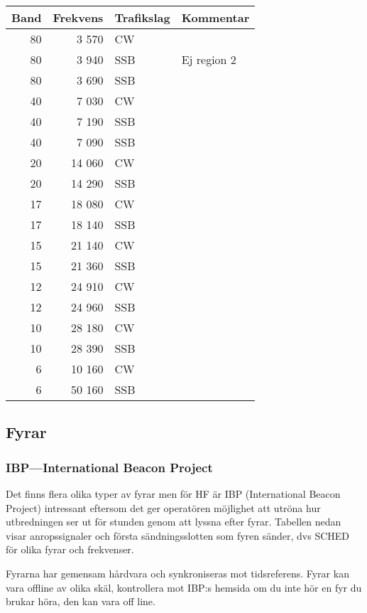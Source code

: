 \begin{tabular}{rrll}
	Band & Frekvens & Trafikslag & Kommentar   \\ \hline
	  80 &    3 570 & CW         &  \\
	  80 &    3 940 & SSB        & Ej region 2 \\
	  80 &    3 690 & SSB        &  \\
	  40 &    7 030 & CW         &  \\
	  40 &    7 190 & SSB        &  \\
	  40 &    7 090 & SSB        &  \\
	  20 &   14 060 & CW         &  \\
	  20 &   14 290 & SSB        &  \\
	  17 &   18 080 & CW         &  \\
	  17 &   18 140 & SSB        &  \\
	  15 &   21 140 & CW         &  \\
	  15 &   21 360 & SSB        &  \\
	  12 &   24 910 & CW         &  \\
	  12 &   24 960 & SSB        &  \\
	  10 &   28 180 & CW         &  \\
	  10 &   28 390 & SSB        &  \\
	   6 &   10 160 & CW         &  \\
	   6 &   50 160 & SSB        &
\end{tabular}

\subsection{Fyrar}

\subsubsection{IBP---International Beacon Project}

Det finns flera olika typer av fyrar men för HF är IBP (International Beacon Project) intressant eftersom det ger operatören möjlighet att utröna hur utbredningen ser ut för stunden genom att lyssna efter fyrar. Tabellen nedan visar anropssignaler och första sändningsslotten som fyren sänder, dvs SCHED för olika fyrar och frekvenser.

Fyrarna har gemensam hårdvara och synkroniseras mot tidsreferens. Fyrar kan vara offline av olika skäl, kontrollera mot IBP:s hemsida om du inte hör en fyr du brukar höra, den kan vara off line.


